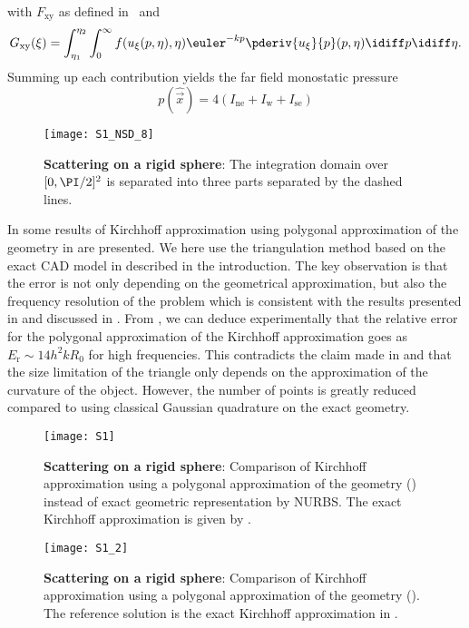 with $F_{\mathrm{xy}}$ as defined in~ and 
\begin{equation*}
	G_{\mathrm{xy}}(\xi) = \int_{\eta_1}^{\eta_2}\int_0^\infty f(u_{\xi}(p,\eta),\eta)\euler^{-k p}\pderiv{u_{\xi}}{p}(p,\eta)\idiff p\idiff \eta.
\end{equation*}
Summing up each contribution yields the far field monostatic pressure
\begin{equation*}
	p(\hat{\vec{x}}) = 4(I_{\mathrm{ne}}+I_{\mathrm{w}}+I_{\mathrm{se}})
\end{equation*}
\begin{figure}
	\centering
	\texttt{[image: S1\_NSD\_8]}
	\caption{\textbf{Scattering on a rigid sphere}: The integration domain over $[0,\PI/2]^2$ is separated into three parts separated by the dashed lines.}
	\label{Fig4:rigidSphereParmSep}
\end{figure}

In  some results of Kirchhoff approximation using polygonal approximation of the geometry in  are presented. We here use the triangulation method based on the exact CAD model in  described in the introduction. The key observation is that the error is not only depending on the geometrical approximation, but also the frequency resolution of the problem which is consistent with the results presented in \cite{Fillinger2014aen} and discussed in \cite{Gilroy2017tes}. From , we can deduce experimentally that the relative error for the polygonal approximation of the Kirchhoff approximation goes as $E_{\mathrm{r}}\sim 14h^2kR_0$ for high frequencies. This contradicts the claim made in \cite{Schneider2003asb} and \cite{Oestberg2016tes} that the size limitation of the triangle only depends on the approximation of the curvature of the object. However, the number of points is greatly reduced compared to using classical Gaussian quadrature on the exact geometry.
\begin{figure}
	\centering
	\texttt{[image: S1]}
	\caption{\textbf{Scattering on a rigid sphere}: Comparison of Kirchhoff approximation using a polygonal approximation of the geometry () instead of exact geometric representation by NURBS. The exact Kirchhoff approximation is given by .}
	\label{Fig4:polygonApproxTS}
\end{figure}
\begin{figure}
	\centering
	\texttt{[image: S1\_2]}
	\caption{\textbf{Scattering on a rigid sphere}: Comparison of Kirchhoff approximation using a polygonal approximation of the geometry (). The reference solution is the exact Kirchhoff approximation in .}
	\label{Fig4:polygonApproxError}
\end{figure}



